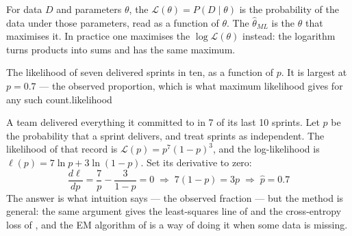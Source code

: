 \begin{definitionbox}
For data $D$ and parameters $\theta$, the  $\mathcal{L}(\theta) =
P(D \mid \theta)$ is the probability of the data under those parameters, read as a
function of $\theta$. The 
$\hat{\theta}_{ML}$ is the $\theta$ that maximises it. In practice one maximises
the  $\log \mathcal{L}(\theta)$ instead: the logarithm turns
products into sums and has the same maximum.
\end{definitionbox}

%
{The likelihood of seven delivered sprints in ten, as a function of $p$. It is largest
at $p=0.7$ --- the observed proportion, which is what maximum likelihood gives for any
such count.}{likelihood}

\begin{worked}
A team delivered everything it committed to in 7 of its last 10 sprints. Let $p$
be the probability that a sprint delivers, and treat sprints as independent. The
likelihood of that record is $\mathcal{L}(p) = p^7(1-p)^3$, and the log-likelihood is
$\ell(p) = 7\ln p + 3\ln(1-p)$. Set its derivative to zero:
\[
\frac{d\ell}{dp} = \frac{7}{p} - \frac{3}{1-p} = 0
\;\Rightarrow\; 7(1-p) = 3p \;\Rightarrow\; \hat{p} = \mathbf{0.7}
\]
The answer is what intuition says --- the observed fraction --- but the method
is general: the same argument gives the least-squares line of  and
the cross-entropy loss of , and the EM algorithm of
 is a way of doing it when some data is missing.
\end{worked}

